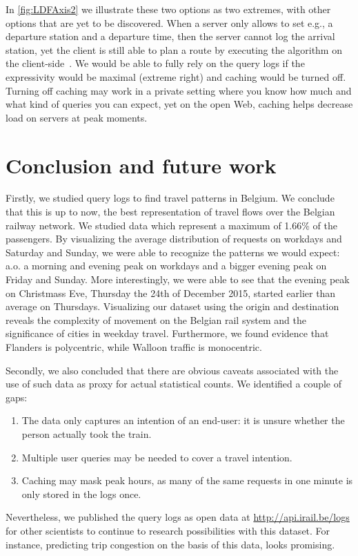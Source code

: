\documentclass{sig-alternate}
\begin{document}
In \cref{fig:LDFAxis2} we illustrate these two options as two extremes, with other options that are yet to be discovered.
When a server only allows to set e.g., a departure station and a departure time, then the server cannot log the arrival station, yet the client is still able to plan a route by executing the algorithm on the client-side~\cite{lc}.
We would be able to fully rely on the query logs if the expressivity would be maximal (extreme right) and caching would be turned off. 
Turning off caching may work in a private setting where you know how much and what kind of queries you can expect, yet on the open Web, caching helps decrease load on servers at peak moments.

\section{Conclusion and future work}
\label{sec:conclusion}

Firstly, we studied query logs to find travel patterns in Belgium.
We conclude that this is up to now, the best representation of travel flows over the Belgian railway network.%
We studied data which represent a maximum of 1.66\% of the passengers.
By visualizing the average distribution of requests on workdays and Saturday and Sunday, we were able to recognize the patterns we would expect: a.o. a morning and evening peak on workdays and a bigger evening peak on Friday and Sunday.
More interestingly, we were able to see that the evening peak on Christmass Eve, Thursday the 24th of December 2015, started earlier than average on Thursdays.
Visualizing our dataset using the origin and destination reveals the complexity of movement on the Belgian rail system and the significance of cities in weekday travel.
Furthermore, we found evidence that Flanders is polycentric, while Walloon traffic is monocentric.

Secondly, we also concluded that there are obvious caveats associated with the use of such data as proxy for actual statistical counts. 
We identified a couple of gaps:
\begin{enumerate}
  \item The data only captures an intention of an end-user: it is unsure whether the person actually took the train.
  \item Multiple user queries may be needed to cover a travel intention.
  \item Caching may mask peak hours, as many of the same requests in one minute is only stored in the logs once.
\end{enumerate}
Nevertheless, we published the query logs as open data at \url{http://api.irail.be/logs} for other scientists to continue to research possibilities with this dataset.
For instance, predicting trip congestion on the basis of this data, looks promising. %
\end{document}
